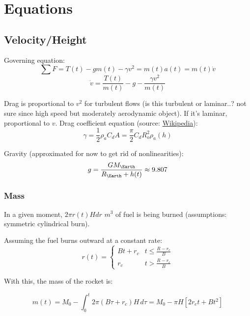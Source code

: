 \documentclass[12pt,a4paper]{article}
\begin{document}
\section{Equations}
\subsection{Velocity/Height}
Governing equation:
$$\sum F = T(t) - gm(t) - \gamma v^2 = m(t)a(t) = m(t)\dot{v}$$
\begin{equation}
\dot{v} = \frac{T(t)}{m(t)} - g - \frac{\gamma v^2}{m(t)}
\label{eq:main}
\end{equation}

Drag is proportional to $v^2$ for turbulent flows (is this turbulent or laminar..? not sure since high speed but moderately aerodynamic object). If it’s laminar, proportional to $v$.
Drag coefficient equation (source: \href{https://en.wikipedia.org/wiki/Drag_(physics)#Types_of_drag}{Wikipedia}):
\begin{equation}
\gamma = \frac{1}{2}\rho_a C_d A = \frac{\pi}{2} C_d R_o^2\rho_a(h)
\label{eq:gamma}
\end{equation}

Gravity (approximated for now to get rid of nonlinearities):
$$g=\frac{GM_{\Earth}}{R_{\Earth} + h(t)} \approx 9.807$$

\subsubsection{Mass}
In a given moment, $2\pi r(t) H dr$ $m^3$ of fuel is being burned (assumptions: symmetric cylindrical burn).

Assuming the fuel burns outward at a constant rate:
\begin{equation}
r(t) = \begin{cases}
Bt + r_c & t \le \frac{R - r_c}{B} \\
r_c      & t > \frac{R - r_c}{B}
\end{cases}
\label{eq:inner-radius}
\end{equation}

With this, the mass of the rocket is:

\begin{equation}
m(t) = M_0 - \int_0^t 2\pi (B\tau+r_c) H\,d\tau = M_0 - \pi H \left[2r_c t + Bt^2\right]
\label{eq:mass}
\end{equation}
\end{document}
